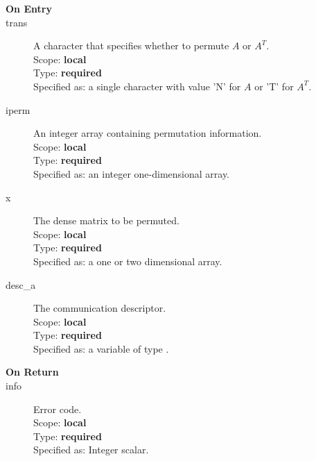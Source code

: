 \begin{description}
\item[\bf On Entry]
\item[trans] A character that specifies whether to permute $A$  or $A^T$.\\
Scope: {\bf local} \\
Type: {\bf required}\\
Specified as: a single character with value 'N' for $A$ or 'T' for $A^T$.\\
\item[iperm] An integer array containing permutation information.\\
Scope: {\bf local} \\
Type: {\bf required}\\
Specified as: an integer one-dimensional array.\\
\item[x] The dense matrix to be permuted.\\
Scope: {\bf local} \\
Type: {\bf required}\\
Specified as: a one or two dimensional array.\\
\item[desc\_a] The communication descriptor.\\
Scope: {\bf local} \\
Type: {\bf required}\\
Specified as: a variable of type \descdata.\\
\end{description}

\begin{description}
\item[\bf On Return]
\item[info] Error code.\\
Scope: {\bf local} \\
Type: {\bf required}\\
Specified as: Integer scalar.\\
\end{description}


%
%


